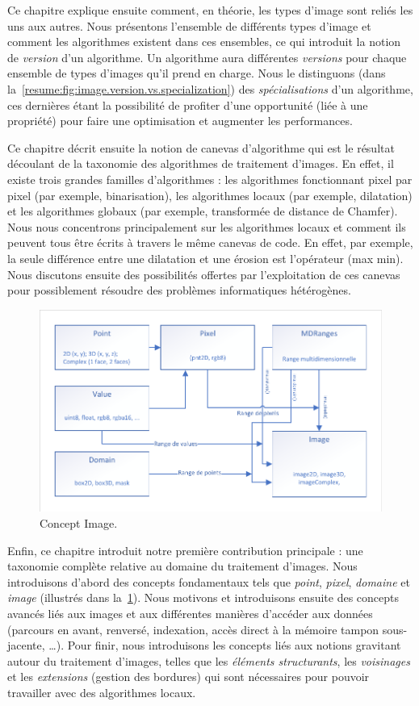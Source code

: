 Ce chapitre explique ensuite comment, en théorie, les types d'image sont reliés les uns aux autres. Nous présentons
l'ensemble de différents types d'image et comment les algorithmes existent dans ces ensembles, ce qui introduit la
notion de \emph{version} d'un algorithme. Un algorithme aura différentes \emph{versions} pour chaque ensemble de types
d'images qu'il prend en charge. Nous le distinguons (dans la~\cref{resume:fig:image.version.vs.specialization}) des
\emph{spécialisations} d'un algorithme, ces dernières étant la possibilité de profiter d'une opportunité (liée à une
propriété) pour faire une optimisation et augmenter les performances.

Ce chapitre décrit ensuite la notion de canevas d'algorithme qui est le résultat découlant de la taxonomie des
algorithmes de traitement d'images. En effet, il existe trois grandes familles d'algorithmes : les algorithmes
fonctionnant pixel par pixel (par exemple, binarisation), les algorithmes locaux (par exemple, dilatation) et les
algorithmes globaux (par exemple, transformée de distance de Chamfer). Nous nous concentrons principalement sur les
algorithmes locaux et comment ils peuvent tous être écrits à travers le même canevas de code. En effet, par exemple, la
seule différence entre une dilatation et une érosion est l'opérateur (max \vs min). Nous discutons ensuite des
possibilités offertes par l'exploitation de ces canevas pour possiblement résoudre des problèmes informatiques
hétérogènes.

\begin{figure}[htbp]
  \centering
  \includegraphics[width=.8\linewidth]{../figures/concepts/image_fr}
  \caption[]{Concept Image.}
  \label{resume:fig:concept.image}
\end{figure}

Enfin, ce chapitre introduit notre première contribution principale : une taxonomie complète relative au domaine du
traitement d'images. Nous introduisons d'abord des concepts fondamentaux tels que \emph{point}, \emph{pixel},
\emph{domaine} et \emph{image} (illustrés dans la~\cref{resume:fig:concept.image}). Nous motivons et introduisons
ensuite des concepts avancés liés aux images et aux différentes manières d'accéder aux données (parcours en avant,
renversé, indexation, accès direct à la mémoire tampon sous-jacente, \ldots). Pour finir, nous introduisons les concepts
liés aux notions gravitant autour du traitement d'images, telles que les \emph{éléments structurants}, les
\emph{voisinages} et les \emph{extensions} (gestion des bordures) qui sont nécessaires pour pouvoir travailler avec des
algorithmes locaux.

